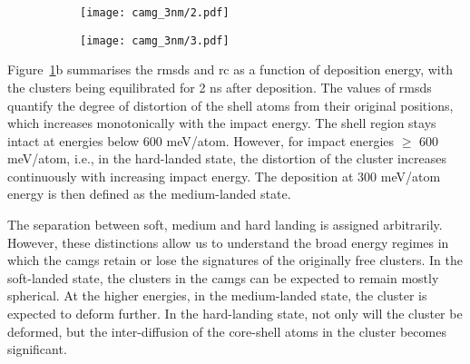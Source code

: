\begin{changebar}
\begin{figure}[!h]
	\centering
	\begin{subfigure}{0.5\textwidth}
		\texttt{[image: camg\_3nm/2.pdf]}
	\end{subfigure}%
	\hfill
	\begin{subfigure}{0.5\textwidth}
		\texttt{[image: camg\_3nm/3.pdf]}
	\end{subfigure}
	\label{f:clus_single3}
\end{figure}

Figure~\ref{f:clus_single3}b summarises the \gls{rmsds} and \gls{rc} as a function of deposition energy, with the clusters being equilibrated for 2 ns after deposition. The values of \gls{rmsds} quantify the degree of distortion of the shell atoms from their original positions, which increases monotonically with the impact energy. The shell region stays intact at energies below 600 meV/atom. However, for impact energies $\geq$ 600 meV/atom, i.e., in the hard-landed state, the distortion of the cluster increases continuously with increasing impact energy. The deposition at 300 meV/atom energy is then defined as the medium-landed state. \par The separation between soft, medium and hard landing is assigned arbitrarily. However, these distinctions allow us to understand the broad energy regimes in which the \gls{camg}s retain or lose the signatures of the originally free clusters. In the soft-landed state, the clusters in the \gls{camg}s can be expected to remain mostly spherical. At the higher energies, in the medium-landed state, the cluster is expected to deform further. In the hard-landing state, not only will the cluster be deformed, but the inter-diffusion of the core-shell atoms in the cluster becomes significant. \par


\end{changebar}
